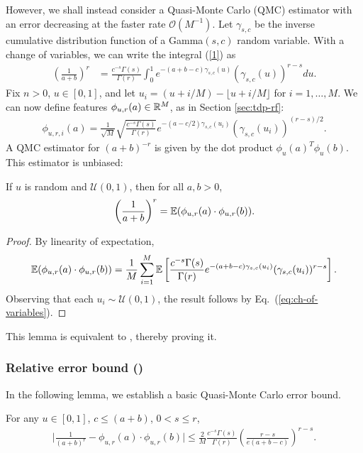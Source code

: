 However, we shall instead consider a Quasi-Monte Carlo (QMC) estimator with an error decreasing at the faster rate $\mathcal O(M^{-1})$.
Let $\gamma_{s,c}$ be the inverse cumulative distribution function of a Gamma$(s,c)$ random variable. With a change of variables, we can write the integral (\ref{1}) as 
\begin{align}
    \label{eq:ch-of-variables}
\left(\frac{1}{a+b}\right)^r 
& = \frac{c^{-s}\Gamma(s)}{\Gamma(r)} \int_0^1 e^{-(a+b-c)\gamma_{s,c}(u)} (\gamma_{s,c}(u))^{r-s}  du.
\end{align}
Fix $n>0$, $u\in[0,1]$, and let $u_i = (u + i/M)- \lfloor u + i/M \rfloor $ for $i=1,\dots,M$. We can now define features $\phi_{u,r}(a)\in \mathbb{R}^M$, as in Section \ref{sec:tdp-rf}:
\begin{align*}
\phi_{u,r,i}(a) =\frac{1}{\sqrt M}\sqrt{\frac{c^{-s}\Gamma(s)}{\Gamma(r)} } e^{-(a-c/2)\gamma_{s,c}(u_i) }(\gamma_{s,c}(u_i))^{(r-s)/2}.
\end{align*}
A QMC estimator for $(a+b)^{-r}$ is given by the dot product $\phi_u(a)^T \phi_u(b)$.
This estimator is unbiased:
\begin{lemma*}
If $u$ is random and $\mathcal U(0,1)$, then for all $a,b>0$,
\begin{align*}
\left(\frac{1}{a+b}\right)^r = \mathbb{E}(\phi_{u,r}(a)\cdot \phi_{u,r}(b)).
\end{align*}
\end{lemma*}
\begin{proof}
By linearity of expectation,
\begin{align*}
\mathbb{E}(\phi_{u,r}(a)\cdot \phi_{u,r}(b)) = \frac{1}{M}\sum_{i=1}^M \mathbb{E}\left[\frac{c^{-s}\Gamma(s)}{\Gamma(r)}  e^{-(a+b-c)\gamma_{s,c}(u_i) }(\gamma_{s,c}(u_i))^{r-s} \right].
\end{align*}
Observing that each $u_i\sim\mathcal U(0,1)$, the result follows by Eq.\ (\ref{eq:ch-of-variables}).
\end{proof}
This lemma is equivalent to , thereby proving it.

\subsubsection{Relative error bound ()}

In the following lemma, we establish a basic Quasi-Monte Carlo error bound.

\begin{lemma}\label{QMC basic lemma} 
For any $u\in[0,1]$, $c\leq (a+b)$, $0<s \le r $,
\begin{align*}
\Big| \frac{1}{(a+b)^r} - \phi_{u,r}(a) \cdot \phi_{u,r}(b) \Big| \leq \frac{2}{M} \frac{c^{-s}\Gamma(s)}{\Gamma(r)} \left(\frac{r-s}{e(a+b-c)}\right)^{r-s}.
\end{align*}
\end{lemma}

